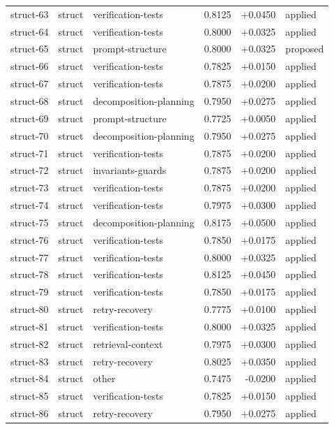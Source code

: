 \begin{center}
\begin{longtable}{llp{5.2cm}rrl}
struct-63 & struct & verification-tests & 0.8125 & +0.0450 & applied \\
struct-64 & struct & verification-tests & 0.8000 & +0.0325 & applied \\
struct-65 & struct & prompt-structure & 0.8000 & +0.0325 & proposed \\
struct-66 & struct & verification-tests & 0.7825 & +0.0150 & applied \\
struct-67 & struct & verification-tests & 0.7875 & +0.0200 & applied \\
struct-68 & struct & decomposition-planning & 0.7950 & +0.0275 & applied \\
struct-69 & struct & prompt-structure & 0.7725 & +0.0050 & applied \\
struct-70 & struct & decomposition-planning & 0.7950 & +0.0275 & applied \\
struct-71 & struct & verification-tests & 0.7875 & +0.0200 & applied \\
struct-72 & struct & invariants-guards & 0.7875 & +0.0200 & applied \\
struct-73 & struct & verification-tests & 0.7875 & +0.0200 & applied \\
struct-74 & struct & verification-tests & 0.7975 & +0.0300 & applied \\
struct-75 & struct & decomposition-planning & 0.8175 & +0.0500 & applied \\
struct-76 & struct & verification-tests & 0.7850 & +0.0175 & applied \\
struct-77 & struct & verification-tests & 0.8000 & +0.0325 & applied \\
struct-78 & struct & verification-tests & 0.8125 & +0.0450 & applied \\
struct-79 & struct & verification-tests & 0.7850 & +0.0175 & applied \\
struct-80 & struct & retry-recovery & 0.7775 & +0.0100 & applied \\
struct-81 & struct & verification-tests & 0.8000 & +0.0325 & applied \\
struct-82 & struct & retrieval-context & 0.7975 & +0.0300 & applied \\
struct-83 & struct & retry-recovery & 0.8025 & +0.0350 & applied \\
struct-84 & struct & other & 0.7475 & -0.0200 & applied \\
struct-85 & struct & verification-tests & 0.7825 & +0.0150 & applied \\
struct-86 & struct & retry-recovery & 0.7950 & +0.0275 & applied \\

\end{longtable}
\end{center}
